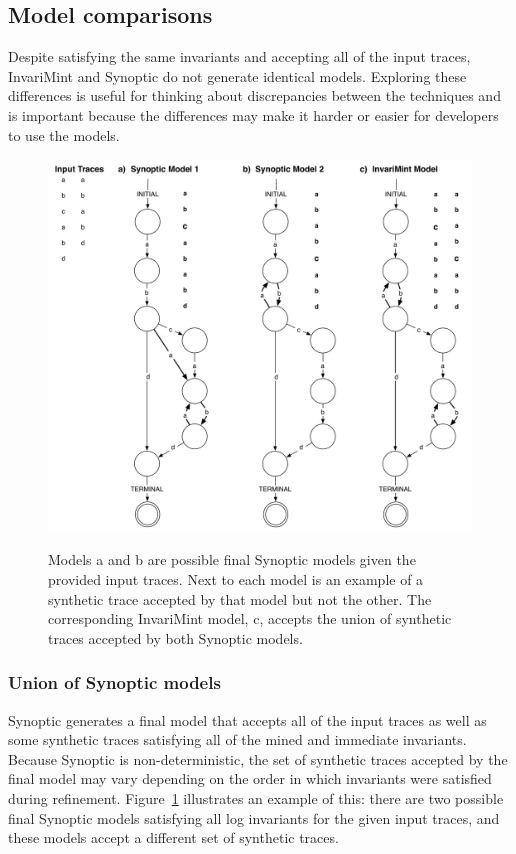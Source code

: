 \subsection{Model comparisons}
Despite satisfying the same invariants and accepting all of the input traces,
InvariMint and Synoptic do not generate identical models. Exploring these
differences is useful for thinking about discrepancies between the techniques
and is important because the differences may make it harder or easier for
developers to use the models.

\begin{figure}[t]
  \center
  {\includegraphics[width=\linewidth]{fig/union.pdf}}
  \caption{Models a and b are possible final Synoptic models given the provided input
  traces. Next to each model is an example of a synthetic trace accepted by that
  model but not the other. The corresponding InvariMint model, c, accepts the union
  of synthetic traces accepted by both Synoptic models.} 
  \label{fig:synthetic}
\end{figure}

\subsubsection{Union of Synoptic models}
Synoptic generates a final model that accepts all of the input traces as well as
some synthetic traces satisfying all of the mined and immediate invariants.
Because Synoptic is non-deterministic, the set of synthetic traces accepted by
the final model may vary depending on the order in which invariants were
satisfied during refinement. Figure~\ref{fig:synthetic} illustrates an example
of this: there are two possible final Synoptic models satisfying
all log invariants for the given input traces, and these models accept a different set of synthetic traces.

